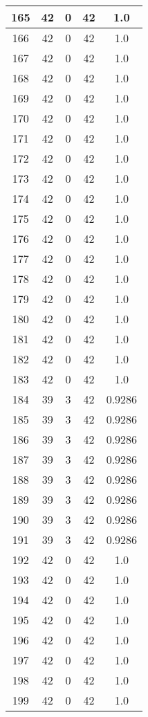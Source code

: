 \documentclass[letterpaper, 12pt]{article}
\begin{document}
\begin{longtable}{|c|c|c|c|c|}
\hline
165 & 42 & 0 & 42 & 1.0 \\
\hline
166 & 42 & 0 & 42 & 1.0 \\
\hline
167 & 42 & 0 & 42 & 1.0 \\
\hline
168 & 42 & 0 & 42 & 1.0 \\
\hline
169 & 42 & 0 & 42 & 1.0 \\
\hline
170 & 42 & 0 & 42 & 1.0 \\
\hline
171 & 42 & 0 & 42 & 1.0 \\
\hline
172 & 42 & 0 & 42 & 1.0 \\
\hline
173 & 42 & 0 & 42 & 1.0 \\
\hline
174 & 42 & 0 & 42 & 1.0 \\
\hline
175 & 42 & 0 & 42 & 1.0 \\
\hline
176 & 42 & 0 & 42 & 1.0 \\
\hline
177 & 42 & 0 & 42 & 1.0 \\
\hline
178 & 42 & 0 & 42 & 1.0 \\
\hline
179 & 42 & 0 & 42 & 1.0 \\
\hline
180 & 42 & 0 & 42 & 1.0 \\
\hline
181 & 42 & 0 & 42 & 1.0 \\
\hline
182 & 42 & 0 & 42 & 1.0 \\
\hline
183 & 42 & 0 & 42 & 1.0 \\
\hline
184 & 39 & 3 & 42 & 0.9286 \\
\hline
185 & 39 & 3 & 42 & 0.9286 \\
\hline
186 & 39 & 3 & 42 & 0.9286 \\
\hline
187 & 39 & 3 & 42 & 0.9286 \\
\hline
188 & 39 & 3 & 42 & 0.9286 \\
\hline
189 & 39 & 3 & 42 & 0.9286 \\
\hline
190 & 39 & 3 & 42 & 0.9286 \\
\hline
191 & 39 & 3 & 42 & 0.9286 \\
\hline
192 & 42 & 0 & 42 & 1.0 \\
\hline
193 & 42 & 0 & 42 & 1.0 \\
\hline
194 & 42 & 0 & 42 & 1.0 \\
\hline
195 & 42 & 0 & 42 & 1.0 \\
\hline
196 & 42 & 0 & 42 & 1.0 \\
\hline
197 & 42 & 0 & 42 & 1.0 \\
\hline
198 & 42 & 0 & 42 & 1.0 \\
\hline
199 & 42 & 0 & 42 & 1.0 \\
\hline
\end{longtable}
\end{document}
